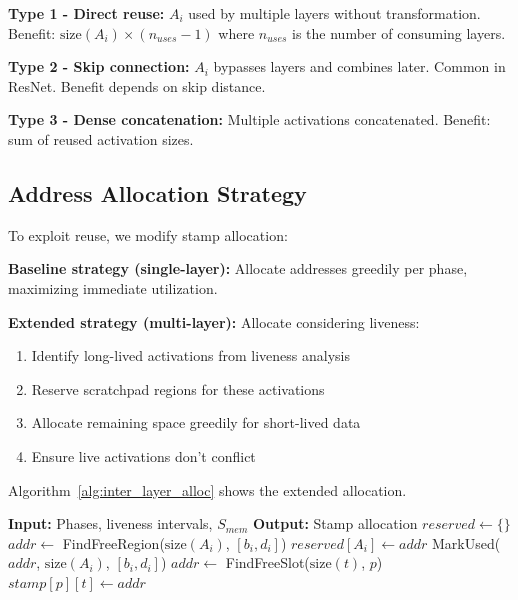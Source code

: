 \documentclass[journal]{IEEEtran}
\begin{document}
\textbf{Type 1 - Direct reuse:} $A_i$ used by multiple layers without transformation. Benefit: $\text{size}(A_i) \times (n_{uses} - 1)$ where $n_{uses}$ is the number of consuming layers.

\textbf{Type 2 - Skip connection:} $A_i$ bypasses layers and combines later. Common in ResNet. Benefit depends on skip distance.

\textbf{Type 3 - Dense concatenation:} Multiple activations concatenated. Benefit: sum of reused activation sizes.

\subsection{Address Allocation Strategy}

To exploit reuse, we modify stamp allocation:

\textbf{Baseline strategy (single-layer):} Allocate addresses greedily per phase, maximizing immediate utilization.

\textbf{Extended strategy (multi-layer):} Allocate considering liveness:
\begin{enumerate}
\item Identify long-lived activations from liveness analysis
\item Reserve scratchpad regions for these activations
\item Allocate remaining space greedily for short-lived data
\item Ensure live activations don't conflict
\end{enumerate}

Algorithm~\ref{alg:inter_layer_alloc} shows the extended allocation.

\begin{algorithm}[t]
\caption{Inter-Layer Memory Allocation}
\label{alg:inter_layer_alloc}
\begin{algorithmic}[1]
\STATE \textbf{Input:} Phases, liveness intervals, $S_{mem}$
\STATE \textbf{Output:} Stamp allocation
\STATE $reserved \gets \{\}$
\STATE {}
  \STATE $addr \gets $ FindFreeRegion($\text{size}(A_i)$, $[b_i, d_i]$)
    \STATE $reserved[A_i] \gets addr$
    \STATE MarkUsed($addr$, $\text{size}(A_i)$, $[b_i, d_i]$)
  \ENDIF
\ENDFOR
\STATE {}
    \STATE $addr \gets $ FindFreeSlot($\text{size}(t)$, $p$)
    \STATE $stamp[p][t] \gets addr$
  \ENDFOR
\ENDFOR
\end{algorithmic}
\end{algorithm}
\end{document}
